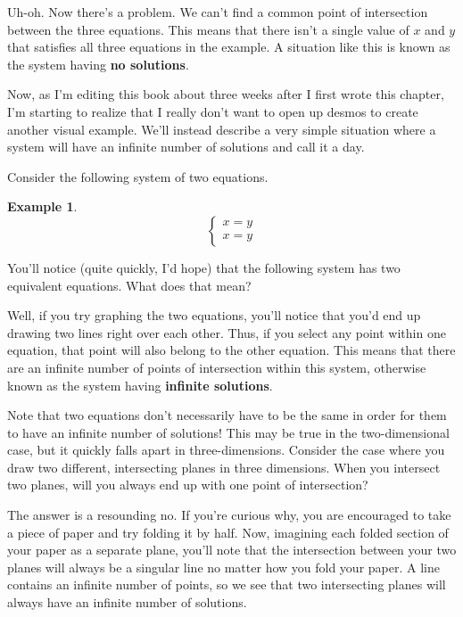 \documentclass{scrbook}
\theoremstyle{definition}
\newtheorem{example}{Example}
\begin{document}
Uh-oh. Now there's a problem. We can't find a common point of intersection between the three equations. This means that there isn't a single value of $x$ and $y$ that satisfies all three equations in the example. A situation like this is known as the system having \textbf{no solutions}.

Now, as I'm editing this book about three weeks after I first wrote this chapter, I'm starting to realize that I really don't want to open up desmos to create another visual example. We'll instead describe a very simple situation where a system will have an infinite number of solutions and call it a day. 

Consider the following system of two equations.

\begin{example}
  \[
    \begin{cases}
      x = y\\
      x = y
    \end{cases}
  \]
\end{example}

You'll notice (quite quickly, I'd hope) that the following system has two equivalent equations. What does that mean?

Well, if you try graphing the two equations, you'll notice that you'd end up drawing two lines right over each other. Thus, if you select any point within one equation, that point will also belong to the other equation. This means that there are an infinite number of points of intersection within this system, otherwise known as the system having \textbf{infinite solutions}.

Note that two equations don't necessarily have to be the same in order for them to have an infinite number of solutions! This may be true in the two-dimensional case, but it quickly falls apart in three-dimensions. Consider the case where you draw two different, intersecting planes in three dimensions. When you intersect two planes, will you always end up with one point of intersection? 

The answer is a resounding no. If you're curious why, you are encouraged to take a piece of paper and try folding it by half. Now, imagining each folded section of your paper as a separate plane, you'll note that the intersection between your two planes will always be a singular line no matter how you fold your paper. A line contains an infinite number of points, so we see that two intersecting planes will always have an infinite number of solutions.
\end{document}
